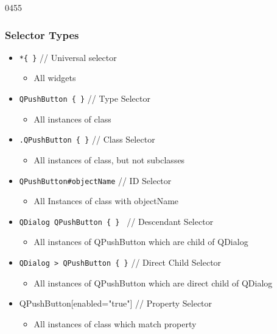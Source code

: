 \begin{slide}{0455}\frametitle{Selector Types}
\begin{itemize}
\item \texttt{*\{ \}} // Universal selector
  \begin{itemize}
  \item All widgets
  \end{itemize}
\item \texttt{QPushButton \{ \}} // Type Selector
  \begin{itemize}
  \item All instances of class
  \end{itemize}
\item\texttt{.QPushButton \{ \}} // Class Selector
  \begin{itemize}
  \item All instances of class, but not subclasses
  \end{itemize}
\item \texttt{QPushButton\#objectName} // ID Selector
  \begin{itemize}
  \item All Instances of class with objectName
  \end{itemize}
\item\texttt{QDialog QPushButton \{ \} } // Descendant Selector
  \begin{itemize}
  \item All instances of QPushButton which are child of QDialog
  \end{itemize}
\item\texttt{QDialog > QPushButton \{ \}} // Direct Child Selector
  \begin{itemize}
  \item All instances of QPushButton which are direct child of QDialog
  \end{itemize}
\item QPushButton[enabled="true"] // Property Selector
  \begin{itemize}
  \item All instances of class which match property
  \end{itemize}
\end{itemize}
\end{slide}

